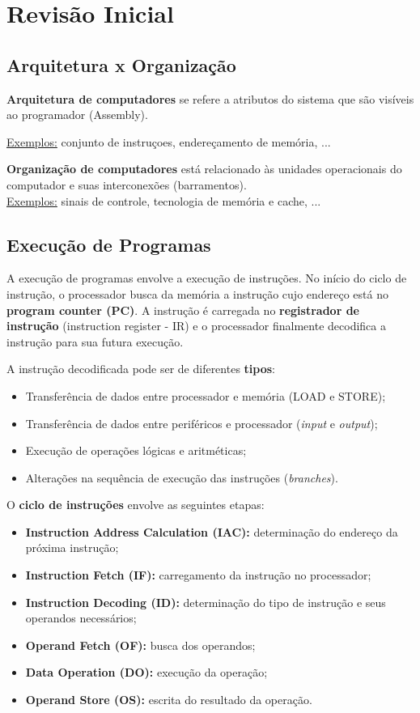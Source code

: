 \chapter{Revisão Inicial}

\section{Arquitetura x Organização}
\textbf{Arquitetura de computadores} se refere a atributos do sistema que são visíveis ao programador (Assembly).

\underline{Exemplos:} conjunto de instruçoes, endereçamento de memória, ...

\textbf{Organização de computadores} está relacionado às unidades operacionais do computador e suas interconexões (barramentos).\\[0.2cm]

\underline{Exemplos:} sinais de controle, tecnologia de memória e cache, ...



\section{Execução de Programas}
A execução de programas envolve a execução de instruções. No início do ciclo de instrução, o processador busca da memória a instrução cujo endereço está no \textbf{program counter (PC)}. A instrução é carregada no \textbf{registrador de instrução} (instruction register - IR) e  o processador finalmente decodifica a instrução para sua futura execução.

A instrução decodificada pode ser de diferentes \textbf{tipos}:

\begin{itemize}
  \item Transferência de dados entre processador e memória (LOAD e STORE);
  \item Transferência de dados entre periféricos e processador (\textit{input} e \textit{output});
  \item Execução de operações lógicas e aritméticas;
  \item Alterações na sequência de execução das instruções (\textit{branches}).
\end{itemize}

O \textbf{ciclo de instruções} envolve as seguintes etapas:

\begin{itemize}
  \item \textbf{Instruction Address Calculation (IAC):} determinação do endereço da próxima instrução;
  \item \textbf{Instruction Fetch (IF):} carregamento da instrução no processador;
  \item \textbf{Instruction Decoding (ID):} determinação do tipo de instrução e seus operandos necessários;
  \item \textbf{Operand Fetch (OF):} busca dos operandos;
  \item \textbf{Data Operation (DO):} execução da operação;
  \item \textbf{Operand Store (OS):} escrita do resultado da operação.
\end{itemize}

